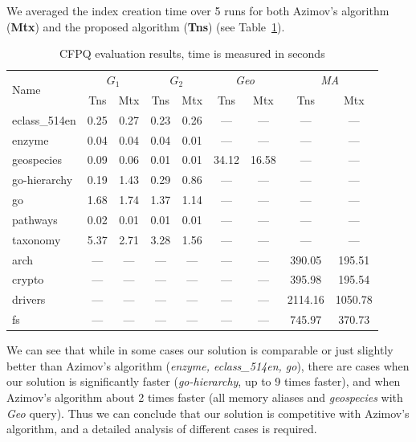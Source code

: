 We averaged the index creation time over 5 runs for both Azimov's algorithm (\textbf{Mtx}) and the proposed algorithm (\textbf{Tns}) (see Table~\ref{tbl:CFPQ_index}).

{\setlength{\tabcolsep}{0.2em}
  \begin{table}
    \caption{CFPQ evaluation results, time is measured in seconds}
    \label{tbl:CFPQ_index}
    \small
    \begin{tabular}{| l | c | c | c | c | c | c | c | c |}
      \hline

      \multirow{2}{*}{Name}  & \multicolumn{2}{c|}{$G_1$} & \multicolumn{2}{c|}{$G_2$} & \multicolumn{2}{c|}{\textit{Geo}} & \multicolumn{2}{c|}{\textit{MA}}\\
      \cline{2-9}
                      & Tns    & Mtx    & Tns  & Mtx  & Tns   & Mtx   & Tns     & Mtx \\
      \hline
      \hline
      eclass\_514en   & 0.25   & 0.27   & 0.23 & 0.26 & ---   & ---   & ---     & ---\\
      enzyme          & 0.04   & 0.04   & 0.04 & 0.01 & ---   & ---   & ---     & ---\\
      geospecies      & 0.09   & 0.06   & 0.01 & 0.01 & 34.12 & 16.58 & ---     & ---\\
      go-hierarchy    & 0.19   & 1.43   & 0.29 & 0.86 & ---   & ---   & ---     & ---\\
      go              & 1.68   & 1.74   & 1.37 & 1.14 & ---   & ---   & ---     & ---\\
      pathways        & 0.02   & 0.01   & 0.01 & 0.01 & ---   & ---   & ---     & ---\\
      taxonomy        & 5.37   & 2.71   & 3.28 & 1.56 & ---   & ---   & ---     & ---\\
      \hline
      arch            & ---    & ---    & ---  & ---  & ---   & ---   & 390.05  & 195.51  \\
      crypto          & ---    & ---    & ---  & ---  & ---   & ---   & 395.98  & 195.54  \\
      drivers         & ---    & ---    & ---  & ---  & ---   & ---   & 2114.16 & 1050.78 \\
      fs              & ---    & ---    & ---  & ---  & ---   & ---   & 745.97  & 370.73  \\
      \hline
    \end{tabular}
  \end{table}
}

We can see that while in some cases our solution is comparable or just slightly better than Azimov's algorithm (\textit{enzyme, eclass\_514en, go}), there are cases when our solution is significantly faster (\textit{go-hierarchy}, up to 9 times faster), and when Azimov's algorithm about 2 times faster (all memory aliases and \textit{geospecies} with \textit{Geo} query).
Thus we can conclude that our solution is competitive with Azimov's algorithm, and a detailed analysis of different cases is required.

